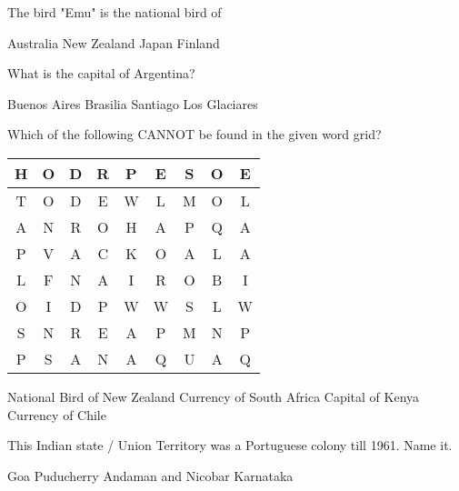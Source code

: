 \begin{questions}
    \question The bird "Emu" is the national bird of \fillin

    \begin{randomizeoneparchoices}
        \CorrectChoice Australia
        \choice New Zealand
        \choice Japan
        \choice Finland
    \end{randomizeoneparchoices}

    \question What is the capital of Argentina?

    \begin{randomizeoneparchoices}
        \CorrectChoice Buenos Aires
        \choice Brasilia
        \choice Santiago
        \choice Los Glaciares
    \end{randomizeoneparchoices}

    \question Which of the following CANNOT be found in the given word grid?

    \begin{center}
        \begin{tabular}{|*{9}{c|}}
            \hline
            H & O & D & R & P & E & S & O & E \\
            \hline
            T & O & D & E & W & L & M & O & L \\
            \hline
            A & N & R & O & H & A & P & Q & A \\
            \hline
            P & V & A & C & K & O & A & L & A \\
            \hline
            L & F & N & A & I & R & O & B & I \\
            \hline
            O & I & D & P & W & W & S & L & W \\
            \hline
            S & N & R & E & A & P & M & N & P \\
            \hline
            P & S & A & N & A & Q & U & A & Q \\
            \hline
        \end{tabular}
    \end{center}

    \begin{randomizechoices}
        \CorrectChoice National Bird of New Zealand
        \choice Currency of South Africa
        \choice Capital of Kenya
        \choice Currency of Chile
    \end{randomizechoices}

    \question This Indian state / Union Territory was a Portuguese colony till 1961. Name it.

    \begin{randomizeoneparchoices}
        \CorrectChoice Goa
        \choice Puducherry
        \choice Andaman and Nicobar
        \choice Karnataka
    \end{randomizeoneparchoices}


\end{questions}
